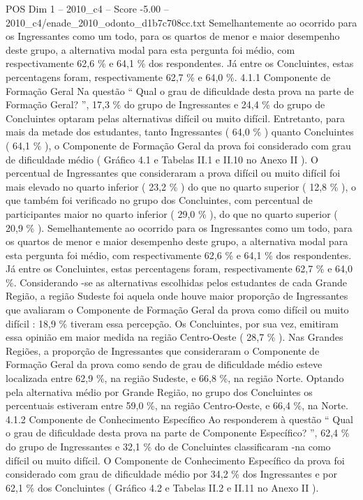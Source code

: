 \begin{textsample}{POS Dim 1 – 2010\_c4 – Score -5.00 – 2010\_c4/enade\_2010\_odonto\_d1b7c708cc.txt}
Semelhantemente ao ocorrido para os Ingressantes como um todo, para os quartos de menor e maior desempenho deste grupo, a alternativa modal para esta pergunta foi médio, com respectivamente 62,6 \% e 64,1 \% dos respondentes.
Já entre os Concluintes, estas percentagens foram, respectivamente 62,7 \% e 64,0 \%. 4.1.1 Componente de Formação Geral Na questão “ Qual o grau de dificuldade desta prova na parte de Formação Geral? ”, 17,3 \% do grupo de Ingressantes e 24,4 \% do grupo de Concluintes optaram pelas alternativas difícil ou muito difícil.
Entretanto, para mais da metade dos estudantes, tanto Ingressantes ( 64,0 \% ) quanto Concluintes ( 64,1 \% ), o Componente de Formação Geral da prova foi considerado com grau de dificuldade médio ( Gráfico 4.1 e Tabelas II.1 e II.10 no Anexo II ).
O percentual de Ingressantes que consideraram a prova difícil ou muito difícil foi mais elevado no quarto inferior ( 23,2 \% ) do que no quarto superior ( 12,8 \% ), o que também foi verificado no grupo dos Concluintes, com percentual de participantes maior no quarto inferior ( 29,0 \% ), do que no quarto superior ( 20,9 \% ).
Semelhantemente ao ocorrido para os Ingressantes como um todo, para os quartos de menor e maior desempenho deste grupo, a alternativa modal para esta pergunta foi médio, com respectivamente 62,6 \% e 64,1 \% dos respondentes.
Já entre os Concluintes, estas percentagens foram, respectivamente 62,7 \% e 64,0 \%.
Considerando -se as alternativas escolhidas pelos estudantes de cada Grande Região, a região Sudeste foi aquela onde houve maior proporção de Ingressantes que avaliaram o Componente de Formação Geral da prova como difícil ou muito difícil : 18,9 \% tiveram essa percepção.
Os Concluintes, por sua vez, emitiram essa opinião em maior medida na região Centro-Oeste ( 28,7 \% ).
Nas Grandes Regiões, a proporção de Ingressantes que consideraram o Componente de Formação Geral da prova como sendo de grau de dificuldade médio esteve localizada entre 62,9 \%, na região Sudeste, e 66,8 \%, na região Norte.
Optando pela alternativa médio por Grande Região, no grupo dos Concluintes os percentuais estiveram entre 59,0 \%, na região Centro-Oeste, e 66,4 \%, na Norte. 4.1.2 Componente de Conhecimento Específico Ao responderem à questão “ Qual o grau de dificuldade desta prova na parte de Componente Específico? ”, 62,4 \% do grupo de Ingressantes e 32,1 \% do de Concluintes classificaram -na como difícil ou muito difícil.
O Componente de Conhecimento Específico da prova foi considerado com grau de dificuldade médio por 34,2 \% dos Ingressantes e por 62,1 \% dos Concluintes ( Gráfico 4.2 e Tabelas II.2 e II.11 no Anexo II ).

\end{textsample}
